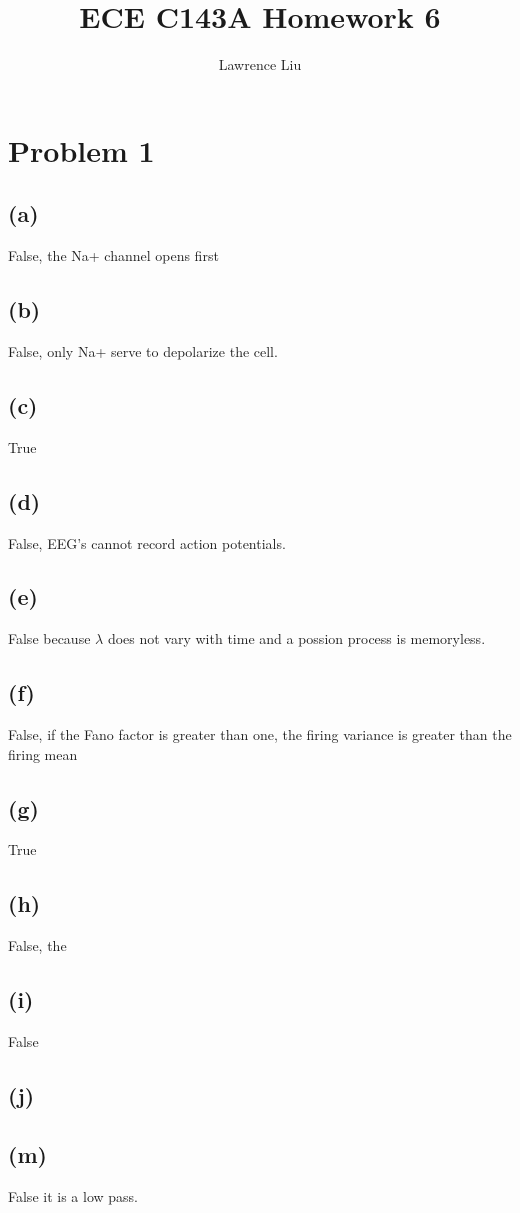 \documentclass[12pt]{article}
\title{ECE C143A Homework 6}
\author{Lawrence Liu}
\begin{document}
\maketitle
\section*{Problem 1}
\subsection*{(a)}
False, the Na+ channel opens first
\subsection*{(b)}
False, only Na+ serve to depolarize the cell.
\subsection*{(c)}
True
\subsection*{(d)}
False, EEG's cannot record action potentials.
\subsection*{(e)}
False because $\lambda$ does not vary with time and a possion process is memoryless.
\subsection*{(f)}
False, if the Fano factor is greater than one, the firing variance is greater than the firing mean
\subsection*{(g)}
True
\subsection*{(h)}
False, the 
\subsection*{(i)}
False
\subsection*{(j)}

\subsection*{(m)}
False it is a low pass.
\end{document}
